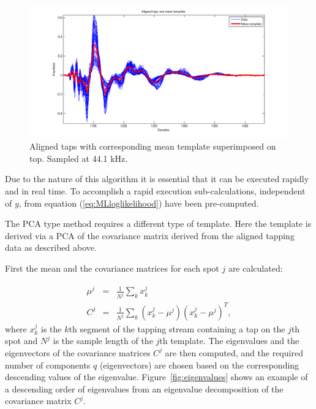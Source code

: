 \begin{figure}[!]
\centering
\includegraphics[width=150mm]{alignedAndMean.png}
\caption{Aligned taps with corresponding mean template superimposed on top. Sampled at 44.1 kHz.}\label{fig:alignedAndMean}
\end{figure}

Due to the nature of this algorithm it is essential that it can be executed rapidly and in real time. To accomplish a rapid execution sub-calculations, independent of $y$, from equation (\ref{eq:MLloglikelihood}) have been pre-computed.

The PCA type method requires a different type of template. Here the template is derived via a PCA of the covariance matrix derived from the aligned tapping data as described above.

First the mean and the covariance matrices for each spot $j$ are calculated:

\begin{eqnarray}\nonumber
\mu^j &=& \frac{1}{N^j} \sum_k x^j_k \\\label{eq:PCAcovariance}
C^j &=& \frac{1}{N^j}\sum_k \left(x^j_k - \mu^j\right)\left(x^j_k - \mu^j\right)^T,
\end{eqnarray}
where $x^j_k$ is the $k$th segment of the tapping stream containing a tap on the $j$th spot and $N^j$ is the sample length of the $j$th template. The eigenvalues and the eigenvectors of the covariance matrices $C^j$ are then computed, and the required number of components $q$ (eigenvectors) are chosen based on the corresponding descending values of the eigenvalue. Figure~\ref{fig:eigenvalues} shows an example of a descending order of eigenvalues from an eigenvalue decomposition of the covariance matrix $C^j$.

